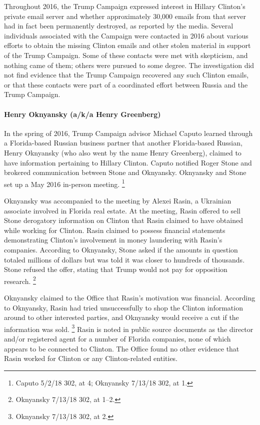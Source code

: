 Throughout 2016, the Trump Campaign expressed interest in Hillary Clinton's private email server and whether approximately 30,000 emails from that server had in fact been permanently destroyed, as reported by the media.
Several individuals associated with the Campaign were contacted in 2016 about various efforts to obtain the missing Clinton emails and other stolen material in support of the Trump Campaign.
Some of these contacts were met with skepticism, and nothing came of them; others were pursued to some degree.
The investigation did not find evidence that the Trump Campaign recovered any such Clinton emails, or that these contacts were part of a coordinated effort between Russia and the Trump Campaign.

\paragraph{Henry Oknyansky (a/k/a Henry Greenberg)}

In the spring of 2016, Trump Campaign advisor Michael Caputo learned through a Florida-based Russian business partner that another Florida-based Russian, Henry Oknyansky (who also went by the name Henry Greenberg), claimed to have information pertaining to Hillary Clinton.
Caputo notified Roger Stone and brokered communication between Stone and Oknyansky.
Oknyansky and Stone set up a May 2016 in-person meeting.%
\footnote{Caputo 5/2/18 302, at 4;
Oknyansky 7/13/18 302, at 1.}

Oknyansky was accompanied to the meeting by Alexei Rasin, a Ukrainian associate involved in Florida real estate.
At the meeting, Rasin offered to sell Stone derogatory information on Clinton that Rasin claimed to have obtained while working for Clinton.
Rasin claimed to possess financial statements demonstrating Clinton's involvement in money laundering with Rasin's companies.
According to Oknyansky, Stone asked if the amounts in question totaled millions of dollars but was told it was closer to hundreds of thousands.
Stone refused the offer, stating that Trump would not pay for opposition research.%
\footnote{Oknyansky 7/13/18 302, at 1--2.}

Oknyansky claimed to the Office that Rasin's motivation was financial.
According to Oknyansky, Rasin had tried unsuccessfully to shop the Clinton information around to other interested parties, and Oknyansky would receive a cut if the information was sold.%
\footnote{Oknyansky 7/13/18 302, at 2.}
Rasin is noted in public source documents as the director and/or registered agent for a number of Florida companies, none of which appears to be connected to Clinton.
The Office found no other evidence that Rasin worked for Clinton or any Clinton-related entities.

